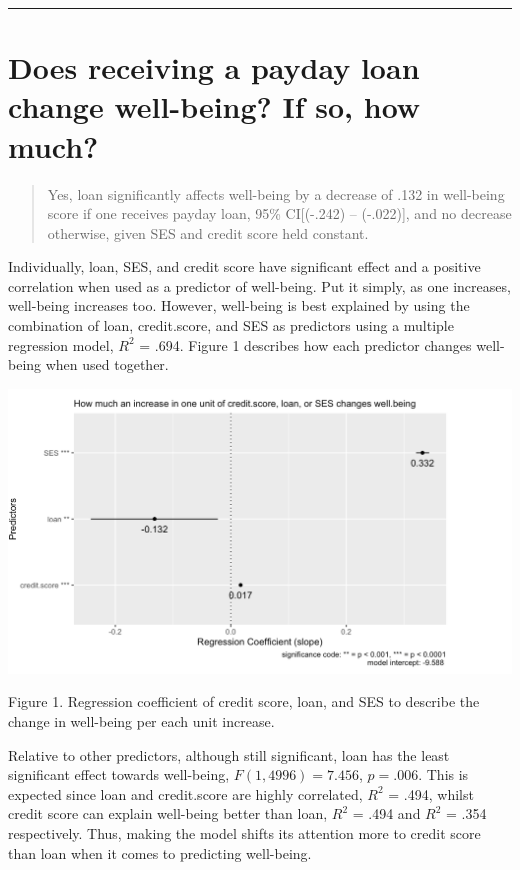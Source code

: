 \documentclass[]{article}
\begin{document}
\begin{center}\rule{0.5\linewidth}{\linethickness}\end{center}

\hypertarget{does-receiving-a-payday-loan-change-well-being-if-so-how-much}{%
\section{Does receiving a payday loan change well-being? If so, how
much?}\label{does-receiving-a-payday-loan-change-well-being-if-so-how-much}}

\begin{quote}
Yes, loan significantly affects well-being by a decrease of .132 in
well-being score if one receives payday loan, 95\% CI{[}(-.242) --
(-.022){]}, and no decrease otherwise, given SES and credit score held
constant.
\end{quote}

Individually, loan, SES, and credit score have significant effect and a
positive correlation when used as a predictor of well-being. Put it
simply, as one increases, well-being increases too. However, well-being
is best explained by using the combination of loan, credit.score, and
SES as predictors using a multiple regression model, \(R^2\) = .694.
Figure 1 describes how each predictor changes well-being when used
together.

\includegraphics{figure-1.png}

Figure 1. Regression coefficient of credit score, loan, and SES to
describe the change in well-being per each unit increase.

Relative to other predictors, although still significant, loan has the
least significant effect towards well-being, \(F(1,4996)=7.456\),
\(p = .006\). This is expected since loan and credit.score are highly
correlated, \(R^2\) = .494, whilst credit score can explain well-being
better than loan, \(R^2\) = .494 and \(R^2\) = .354 respectively. Thus,
making the model shifts its attention more to credit score than loan
when it comes to predicting well-being.
\end{document}
